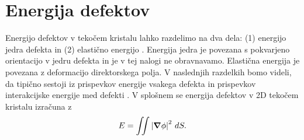\documentclass[11pt]{article}
\begin{document}
\section{Energija defektov}
Energijo defektov v tekočem kristalu lahko razdelimo na dva dela: (1) energijo jedra defekta in (2) elastično energijo \cite{chaikin1995principles}. Energija jedra je povezana s pokvarjeno orientacijo v jedru defekta in je v tej nalogi ne obravnavamo. Elastična energija je povezana z deformacijo direktorskega polja. V naslednjih razdelkih bomo videli, da tipično sestoji iz prispevkov energije vsakega defekta in prispevkov interakcijske energije med defekti \cite{chaikin1995principles}. V splošnem se energija defektov v 2D tekočem kristalu izračuna \cite{chandrasekhar1986structure} z
\begin{equation}
\label{eq:energija_splosno}
    E = \iint \left|\grad\phi\right|^{2}\,dS.
\end{equation}
\end{document}
